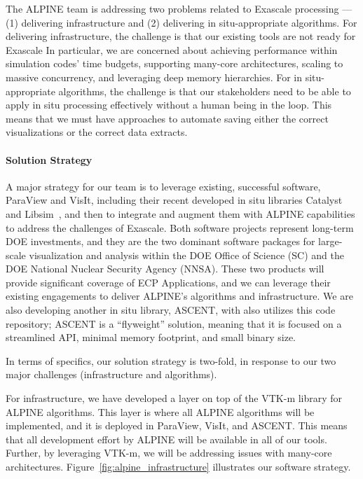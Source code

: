 The ALPINE team is addressing two problems related to Exascale processing --- (1) delivering infrastructure and (2) delivering in situ-appropriate algorithms.
%
For delivering infrastructure, the challenge is that our existing tools are not ready for Exascale 
%
In particular, we are concerned about achieving performance within simulation codes' time budgets, supporting many-core architectures, scaling to massive concurrency, and leveraging deep memory hierarchies.
%
For in situ-appropriate algorithms, the challenge is that our stakeholders need to be able to apply in situ processing effectively without a human being in the loop.
%
This means that we must have approaches to automate saving either the correct visualizations or the correct data extracts.


\paragraph{Solution Strategy}

A major strategy for our team is to leverage existing, successful software, ParaView and VisIt, including their recent developed in situ libraries Catalyst~\cite{Catalyst} and Libsim~\cite{LibSim}, and then to integrate and augment them with ALPINE capabilities to address the challenges of Exascale. 
%
Both software projects represent long-term DOE investments, and they are the two dominant software packages for large-scale visualization and analysis within the DOE Office of Science (SC) and the DOE National Nuclear Security Agency (NNSA). 
%
These two products will provide significant coverage of ECP Applications, and we can leverage their existing engagements to deliver ALPINE's algorithms and infrastructure. 
%
%
We are also developing another in situ library, ASCENT, with also utilizes this code repository; ASCENT is a ``flyweight'' solution,
meaning that it is focused on a streamlined API, minimal memory footprint, and small binary size.

In terms of specifics, our solution strategy is two-fold, in response to our two major challenges (infrastructure and algorithms).

For infrastructure, we have developed a layer on top of the VTK-m library for ALPINE algorithms.
%
This layer is where all ALPINE algorithms will be implemented, and it is deployed in ParaView, VisIt, and ASCENT.
%
This means that all development effort by ALPINE will be available in all of our tools.
%
Further, by leveraging VTK-m, we will be addressing issues with many-core architectures.
%
Figure~\ref{fig:alpine_infrastructure} illustrates our software strategy.

